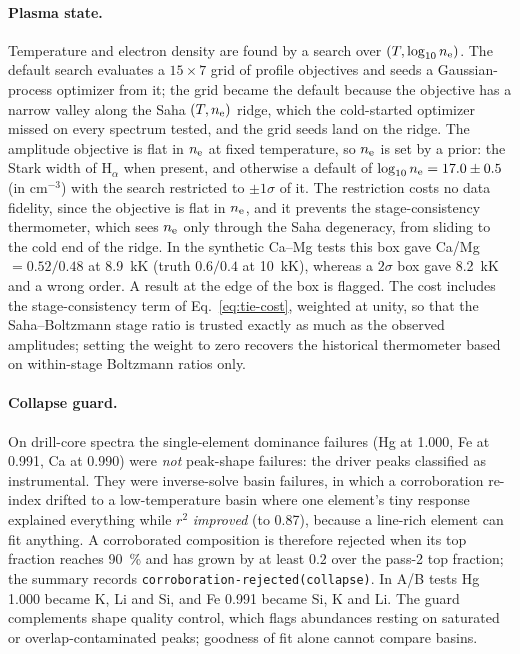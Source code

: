 \paragraph{Plasma state.}
Temperature and electron density are found by a search over $(T,\log_{10}n_{\mathrm{e}})$.
The default search evaluates a $15\times 7$ grid of profile objectives and seeds a
Gaussian-process optimizer \citep{jones1998ego} from it; the grid became the default because
the objective has a narrow valley along the Saha $(T,n_{\mathrm{e}})$ ridge, which the
cold-started optimizer missed on every spectrum tested, and the grid seeds land on the ridge.
The amplitude objective is flat in $n_{\mathrm{e}}$ at fixed temperature, so $n_{\mathrm{e}}$ is set by a prior:
the Stark width of H$_\alpha$ \citep{gigosos2003halpha} when present, and otherwise a default of
$\log_{10}n_{\mathrm{e}} = 17.0 \pm 0.5$ (in cm$^{-3}$) with the search restricted to
$\pm 1\sigma$ of it.
The restriction costs no data fidelity, since the objective is flat in $n_{\mathrm{e}}$, and
it prevents the stage-consistency thermometer, which sees $n_{\mathrm{e}}$ only through the Saha
degeneracy, from sliding to the cold end of the ridge.
In the synthetic Ca--Mg tests this box gave Ca/Mg $=0.52/0.48$ at \SI{8.9}{kK} (truth $0.6/0.4$ at
\SI{10}{kK}), whereas a $2\sigma$ box gave \SI{8.2}{kK} and a wrong order.
A result at the edge of the box is flagged.
The cost includes the stage-consistency term of Eq.~\eqref{eq:tie-cost}, weighted at unity,
so that the Saha--Boltzmann stage ratio is trusted exactly as much as the observed amplitudes;
setting the weight to zero recovers the historical thermometer based on within-stage
Boltzmann ratios only.

\paragraph{Collapse guard.}
On drill-core spectra the single-element dominance failures (Hg at 1.000, Fe at 0.991,
Ca at 0.990) were \emph{not} peak-shape failures: the driver peaks classified as
instrumental.
They were inverse-solve basin failures, in which a corroboration re-index drifted to a
low-temperature basin where one element's tiny response explained everything while
$r^2$ \emph{improved} (to 0.87), because a line-rich element can fit anything.
A corroborated composition is therefore rejected when its top fraction reaches
\SI{90}{\percent} and has grown by at least $0.2$ over the pass-2 top fraction; the summary records
\texttt{corroboration-rejected(collapse)}.
In A/B tests Hg 1.000 became K, Li and Si, and Fe 0.991 became Si, K and Li.
The guard complements shape quality control, which flags abundances resting on saturated or overlap-contaminated peaks; goodness of fit alone cannot compare basins.

